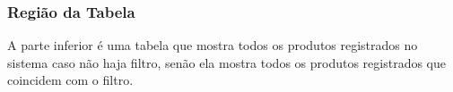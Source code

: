 \documentclass[
	article,			%
	12pt,				%
	oneside,			%
	a4paper,			%
	english,			%
	brazil,				%
	sumario=tradicional
	]{abntex2}
\begin{document}
			\subsubsection{Região da Tabela}
			A parte inferior é uma tabela que mostra todos os produtos registrados no sistema caso não haja filtro, senão ela mostra todos os produtos registrados que coincidem com o filtro.
\newpage
%			
%			
	\newpage
\end{document}
